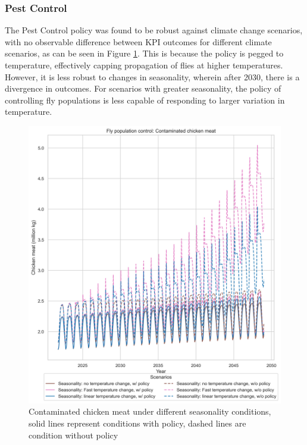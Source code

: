 \subsubsection{Pest Control}
\label{sec: pest control}
The Pest Control policy was found to be robust against climate change scenarios, with no observable difference between KPI outcomes for different climate scenarios, as can be seen in Figure \ref{fig:pc_seas_meat}. This is because the policy is pegged to temperature, effectively capping propagation of flies at higher temperatures. However, it is less robust to changes in seasonality, wherein after 2030, there is a divergence in outcomes. For scenarios with greater seasonality, the policy of controlling fly populations is less capable of responding to larger variation in temperature. 

\begin{figure}[h!]
    \centering
    \begin{minipage}{0.45\textwidth}
        \centering
        \includegraphics[width=1\textwidth]{images/pc_Seasonal_meat.png}
        \caption{Contaminated chicken meat under different seasonality conditions, solid lines represent conditions with policy, dashed lines are condition without policy}
        \label{fig:pc_seas_meat}

\end{minipage}
\end{figure}
